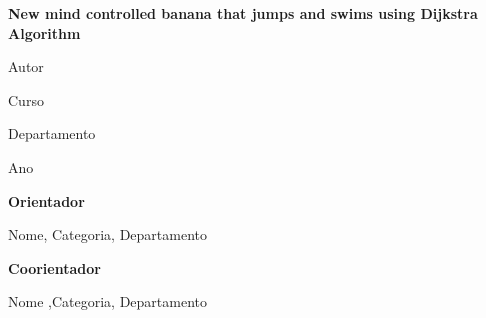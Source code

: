 \documentclass{report}
\begin{document}

\begin{flushleft}
\HUGE \textbf{New mind controlled banana that jumps and swims using Dijkstra Algorithm}

\vspace{5mm}
\vfill
\LARGE Autor

\large Curso

\normalsize Departamento

\normalsize Ano

\vspace{5mm}


\large \textbf{Orientador}

\normalsize Nome, Categoria, Departamento

\vspace{5mm}

\large \textbf{Coorientador}

\normalsize Nome ,Categoria, Departamento

\end{flushleft}
\vfill
\end{document}
